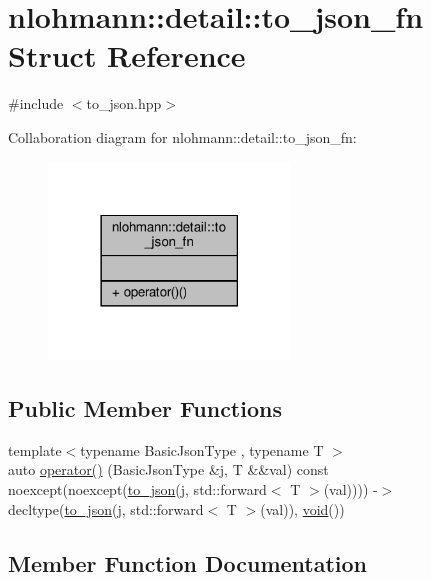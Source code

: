 \hypertarget{structnlohmann_1_1detail_1_1to__json__fn}{}\section{nlohmann\+:\+:detail\+:\+:to\+\_\+json\+\_\+fn Struct Reference}
\label{structnlohmann_1_1detail_1_1to__json__fn}


{\ttfamily \#include $<$to\+\_\+json.\+hpp$>$}



Collaboration diagram for nlohmann\+:\+:detail\+:\+:to\+\_\+json\+\_\+fn\+:\nopagebreak
\begin{figure}[H]
\begin{center}
\leavevmode
\includegraphics[width=182pt]{structnlohmann_1_1detail_1_1to__json__fn__coll__graph}
\end{center}
\end{figure}
\subsection*{Public Member Functions}
\begin{DoxyCompactItemize}
\item 
{\footnotesize template$<$typename Basic\+Json\+Type , typename T $>$ }\\auto \hyperlink{structnlohmann_1_1detail_1_1to__json__fn_aecfb5114c8a737fc89d98589482795b8}{operator()} (Basic\+Json\+Type \&j, T \&\&val) const noexcept(noexcept(\hyperlink{namespacenlohmann_1_1detail_a1a804b98cbe89b7e44b698f2ca860490}{to\+\_\+json}(j, std\+::forward$<$ T $>$(val)))) -\/$>$ decltype(\hyperlink{namespacenlohmann_1_1detail_a1a804b98cbe89b7e44b698f2ca860490}{to\+\_\+json}(j, std\+::forward$<$ T $>$(val)), \hyperlink{namespacenlohmann_1_1detail_a59fca69799f6b9e366710cb9043aa77d}{void}())
\end{DoxyCompactItemize}


\subsection{Member Function Documentation}
\mbox{\label{structnlohmann_1_1detail_1_1to__json__fn_aecfb5114c8a737fc89d98589482795b8}} 
